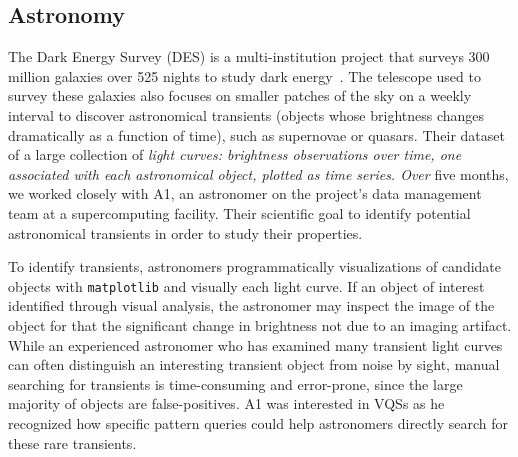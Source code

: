  \subsection{Astronomy}
 \par\noindent{} 
 The Dark Energy Survey (DES) is a multi-institution project that surveys 300 million galaxies over 525 nights to study dark energy~\cite{Drlica-Wagner2017}. The telescope used to survey these galaxies also focuses on smaller patches of the sky on a weekly interval to discover astronomical transients (objects whose brightness changes dramatically as a function of time), such as supernovae or quasars. Their dataset  of a large collection of \emph{light curves: brightness observations over time, one associated with each astronomical object, plotted as time series. Over} five months, we worked closely with A1, an astronomer on the project's data management team at a supercomputing facility. Their scientific goal  to identify potential astronomical transients in order to study their properties. 
 \par\noindent{} 
 \npar To identify transients, astronomers programmatically  visualizations of candidate objects with \texttt{matplotlib} and visually  each light curve. If an object of interest  identified through visual analysis, the astronomer may inspect the image of the object for  that the significant change in brightness  not due to an imaging artifact. While an experienced astronomer who has examined many transient light curves can often distinguish an interesting transient object from noise by sight, manual searching for transients is time-consuming and error-prone, since the large majority of objects are false-positives. A1 was interested in VQSs as he recognized how specific pattern queries could help astronomers directly search for these rare transients.
